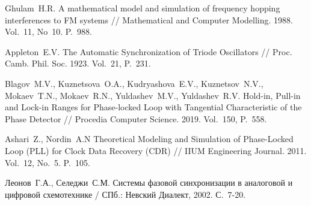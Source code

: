 \documentclass[a4paper,14pt]{article} %
\begin{document}
\begin{thebibliography}{20}
 Ghulam~H.\:R. A mathematical model and simulation of frequency hopping interferences to FM systems // Mathematical and Computer Modelling. 1988. Vol.~11, No~10. P.~988.

 Appleton~E.\:V. The Automatic Synchronization of Triode Oscillators // Proc. Camb. Phil. Soc. 1923. Vol.~21, P.~231.

 Blagov~M.\:V., Kuznetsova~O.\:A., Kudryashova~E.\:V., Kuznetsov~N.\:V., Mokaev~T.\:N., Mokaev~R.\:N., Yuldashev~M.\:V., Yuldashev~R.\:V. Hold-in, Pull-in and Lock-in Ranges for Phase-locked Loop with Tangential Characteristic of the Phase Detector // Procedia Computer Science. 2019.
Vol.~150, P.~558.

Ashari~Z., Nordin~A.\:N Theoretical Modeling and Simulation of Phase-Locked Loop (PLL) for Clock Data Recovery (CDR) // IIUM Engineering Journal. 2011. Vol.~12, No.~5. P.~105.

Леонов~Г.\:А., Селеджи~С.\:М. Системы фазовой синхронизации в аналоговой и цифровой схемотехнике / СПб.: Невский Диалект, 2002. С.~7-20.
\end{thebibliography}
\end{document}

